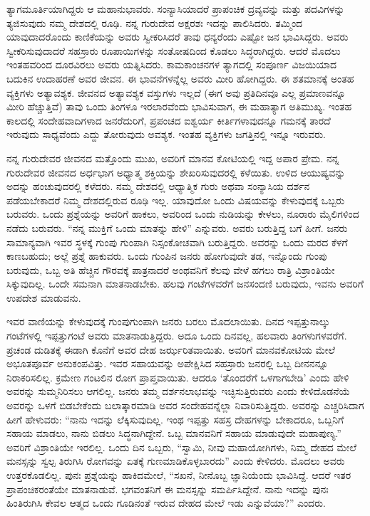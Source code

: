 ತ್ಯಾಗಮೂರ್ತಿಯಾಗಿದ್ದರು ಆ ಮಹಾನುಭಾವರು. ಸಂನ್ಯಾಸಿಯಾದರೆ ಪ್ರಾಪಂಚಿಕ ದ್ರವ್ಯವನ್ನು ಮತ್ತು ಪದವಿಗಳನ್ನು ತ್ಯಜಿಸುವುದು ನಮ್ಮ ದೇಶದಲ್ಲಿ ರೂಢಿ. ನನ್ನ ಗುರುದೇವ ಅಕ್ಷರಶಃ ಇದನ್ನು ಪಾಲಿಸಿದರು. ತಮ್ಮಿಂದ ಯಾವುದಾದರೊಂದು ಕಾಣಿಕೆಯನ್ನು ಅವರು ಸ್ವೀಕರಿಸಿದರೆ ತಾವು ಧನ್ಯರೆಂದು ಎಷ್ಟೋ ಜನ ಭಾವಿಸಿದ್ದರು. ಅವರು ಸ್ವೀಕರಿಸುವುದಾದರೆ ಸಹಸ್ರಾರು ರೂಪಾಯಿಗಳನ್ನು ಸಂತೋಷದಿಂದ ಕೊಡಲು ಸಿದ್ಧರಾಗಿದ್ದರು. ಆದರೆ ಮೊದಲು ಇಂತಹವರಿಂದ ದೂರವಿರಲು ಅವರು ಯತ್ನಿಸಿದರು. ಕಾಮಕಾಂಚನಗಳ ತ್ಯಾಗದಲ್ಲಿ ಸಂಪೂರ್ಣ ವಿಜಯಿಯಾದ ಬದುಕಿನ ಉದಾಹರಣೆ ಅವರ ಜೀವನ. ಈ ಭಾವನೆಗಳನ್ನೆಲ್ಲ ಅವರು ಮೀರಿ ಹೋಗಿದ್ದರು. ಈ ಶತಮಾನಕ್ಕೆ ಅಂತಹ ವ್ಯಕ್ತಿಗಳು ಅತ್ಯಾವಶ್ಯಕ. ಜೀವನದ ಅತ್ಯಾವಶ್ಯಕ ವಸ್ತುಗಳು ಇಲ್ಲದೆ (ಈಗ ಅವು ಪ್ರತಿದಿನವೂ ಎಲ್ಲ ಪ್ರಮಾಣವನ್ನೂ ಮೀರಿ ಹೆಚ್ಚುತ್ತಿವೆ) ತಾವು ಒಂದು ತಿಂಗಳೂ ಇರಲಾರವೆಂದು ಭಾವಿಸುವಾಗ, ಈ ಮಹಾತ್ಯಾಗ ಅತಿಮುಖ್ಯ. ಇಂತಹ ಕಾಲದಲ್ಲಿ ಸಂದೇಹವಾದಿಗಳಾದ ಜನರೆದುರಿಗೆ, ಪ್ರಪಂಚದ ಐಶ್ವರ್ಯ ಕೀರ್ತಿಗಳಾವುದನ್ನೂ ಗಮನಕ್ಕೆ ತಾರದೆ ಇರುವುದು ಸಾಧ್ಯವೆಂದು ಎದ್ದು ತೋರುವುದು ಅವಶ್ಯಕ. ಇಂತಹ ವ್ಯಕ್ತಿಗಳು ಜಗತ್ತಿನಲ್ಲಿ ಇನ್ನೂ ಇರುವರು.

ನನ್ನ ಗುರುದೇವರ ಜೀವನದ ಮತ್ತೊಂದು ಮುಖ, ಅವರಿಗೆ ಮಾನವ ಕೋಟಿಯಲ್ಲಿ ಇದ್ದ ಅಪಾರ ಪ್ರೇಮ. ನನ್ನ ಗುರುದೇವರ ಜೀವನದ ಅರ್ಧಭಾಗ ಅಧ್ಯಾತ್ಮ ಶಕ್ತಿಯನ್ನು ಶೇಖರಿಸುವುದರಲ್ಲಿ ಕಳೆಯಿತು. ಉಳಿದ ಆಯುಷ್ಯವನ್ನು ಅದನ್ನು ಹಂಚುವುದರಲ್ಲಿ ಕಳೆದರು. ನಮ್ಮ ದೇಶದಲ್ಲಿ ಆಧ್ಯಾತ್ಮಿಕ ಗುರು ಅಥವಾ ಸಂನ್ಯಾಸಿಯ ದರ್ಶನ ಪಡೆಯಬೇಕಾದರೆ ನಿಮ್ಮ ದೇಶದಲ್ಲಿರುವ ರೂಢಿ ಇಲ್ಲ. ಯಾವುದೋ ಒಂದು ವಿಷಯವನ್ನು ಕೇಳುವುದಕ್ಕೆ ಒಬ್ಬರು ಬರುವರು. ಒಂದು ಪ್ರಶ್ನೆಯನ್ನು ಅವರಿಗೆ ಹಾಕಲು, ಅವರಿಂದ ಒಂದು ನುಡಿಯನ್ನು ಕೇಳಲು, ನೂರಾರು ಮೈಲಿಗಳಿಂದ ನಡೆದು ಬರುವರು. “ನನ್ನ ಮುಕ್ತಿಗೆ ಒಂದು ಮಾತನ್ನು ಹೇಳಿ” ಎನ್ನುವರು. ಅವರು ಬರುತ್ತಿದ್ದ ಬಗೆ ಹೀಗೆ. ಜನರು ಸಾಮಾನ್ಯವಾಗಿ ಇವರ ಸ್ಥಳಕ್ಕೆ ಗುಂಪು ಗುಂಪಾಗಿ ನಿಸ್ಸಂಕೋಚವಾಗಿ ಬರುತ್ತಿದ್ದರು. ಅವರನ್ನು ಒಂದು ಮರದ ಕೆಳಗೆ ಕಾಣಬಹುದು; ಅಲ್ಲೆ ಪ್ರಶ್ನೆ ಹಾಕುವರು. ಒಂದು ಗುಂಪಿನ ಜನರು ಹೋಗುವುದೇ ತಡ, ಇನ್ನೊಂದು ಗುಂಪು ಬರುವುದು, ಒಬ್ಬ ಅತಿ ಹೆಚ್ಚಿನ ಗೌರವಕ್ಕೆ ಪಾತ್ರನಾದರೆ ಅಂಥವನಿಗೆ ಕೆಲವು ವೇಳೆ ಹಗಲು ರಾತ್ರಿ ವಿಶ್ರಾಂತಿಯೇ ಸಿಕ್ಕುವುದಿಲ್ಲ. ಒಂದೇ ಸಮನಾಗಿ ಮಾತನಾಡಬೇಕು. ಹಲವು ಗಂಟೆಗಳವರೆಗೆ ಜನಸಂದಣಿ ಬರುವುದು, ಇವನು ಅವರಿಗೆ ಉಪದೇಶ ಮಾಡುವನು.

ಇವರ ವಾಣಿಯನ್ನು ಕೇಳುವುದಕ್ಕೆ ಗುಂಪುಗುಂಪಾಗಿ ಜನರು ಬರಲು ಮೊದಲಾಯಿತು. ದಿನದ ಇಪ್ಪತ್ತುನಾಲ್ಕು ಗಂಟೆಗಳಲ್ಲಿ ಇಪ್ಪತ್ತುಗಂಟೆ ಅವರು ಮಾತನಾಡುತ್ತಿದ್ದರು. ಅದೂ ಒಂದು ದಿನವಲ್ಲ, ಹಲವಾರು ತಿಂಗಳುಗಳವರೆಗೆ. ಪ್ರಚಂಡ ದುಡಿತಕ್ಕೆ ಈಡಾಗಿ ಕೊನೆಗೆ ಅವರ ದೇಹ ಜರ್ಝರಿತವಾಯಿತು. ಅವರಿಗೆ ಮಾನವಕೋಟಿಯ ಮೇಲೆ ಅಭೂತಪೂರ್ವ ಅನುಕಂಪವಿತ್ತು. ಇವರ ಸಹಾಯವನ್ನು ಅಪೇಕ್ಷಿಸಿದ ಸಹಸ್ರಾರು ಜನರಲ್ಲಿ ಒಬ್ಬ ದೀನನನ್ನೂ ನಿರಾಕರಿಸಲಿಲ್ಲ. ಕ್ರಮೇಣ ಗಂಟಲಿನ ರೋಗ ಪ್ರಾಪ್ತವಾಯಿತು. ಆದರೂ ‘ತೊಂದರೆಗೆ ಒಳಗಾಗಬೇಡಿ’ ಎಂದು ಹೇಳಿ ಅವರನ್ನು ಸುಮ್ಮನಿರಿಸಲು ಆಗಲಿಲ್ಲ. ಜನರು ತಮ್ಮ ದರ್ಶನಲಾಭವನ್ನು ಇಚ್ಛಿಸುತ್ತಿರುವರು ಎಂದು ಕೇಳಿದೊಡನೆಯೆ ಅವರನ್ನು ಒಳಗೆ ಬಿಡಬೇಕೆಂದು ಬಲಾತ್ಕಾರಮಾಡಿ ಅವರ ಸಂದೇಹವನ್ನೆಲ್ಲಾ ನಿವಾರಿಸುತ್ತಿದ್ದರು. ಅವರನ್ನು ಎಚ್ಚರಿಸಿದಾಗ ಹೀಗೆ ಹೇಳುವರು: “ನಾನು ಇದನ್ನು ಲೆಕ್ಕಿಸುವುದಿಲ್ಲ. ಇಂಥ ಇಪ್ಪತ್ತು ಸಹಸ್ರ ದೇಹಗಳನ್ನು ಬೇಕಾದರೂ, ಒಬ್ಬನಿಗೆ ಸಹಾಯ ಮಾಡಲು, ನಾನು ಬಿಡಲು ಸಿದ್ಧನಾಗಿದ್ದೇನೆ. ಒಬ್ಬ ಮಾನವನಿಗೆ ಸಹಾಯ ಮಾಡುವುದೇ ಮಹಾಪುಣ್ಯ.” ಅವರಿಗೆ ವಿಶ್ರಾಂತಿಯೇ ಇರಲಿಲ್ಲ. ಒಂದು ದಿನ ಒಬ್ಬರು, “ಸ್ವಾಮಿ, ನೀವು ಮಹಾಯೋಗಿಗಳು, ನಿಮ್ಮ ದೇಹದ ಮೇಲೆ ಮನಸ್ಸನ್ನು ಸ್ವಲ್ಪ ತಿರುಗಿಸಿ ರೋಗವನ್ನು ಏತಕ್ಕೆ ಗುಣಮಾಡಿಕೊಳ್ಳಬಾರದು” ಎಂದು ಕೇಳಿದರು. ಮೊದಲು ಅವರು ಉತ್ತರಕೊಡಲಿಲ್ಲ. ಪುನಃ ಪ್ರಶ್ನೆಯನ್ನು ಹಾಕಿದಮೇಲೆ, “ಸಖನೆ, ನೀನೊಬ್ಬ ಜ್ಞಾನಿಯೆಂದು ಭಾವಿಸಿದ್ದೆ. ಆದರೆ ಇತರ ಪ್ರಾಪಂಚಿಕರಂತೆಯೇ ಮಾತನಾಡುವೆ. ಭಗವಂತನಿಗೆ ಈ ಮನಸ್ಸನ್ನು ಸಮರ್ಪಿಸಿದ್ದೇನೆ. ನಾನು ಇದನ್ನು ಪುನಃ ಹಿಂತಿರುಗಿಸಿ ಕೇವಲ ಆತ್ಮದ ಒಂದು ಗೂಡಿನಂತೆ ಇರುವ ದೇಹದ ಮೇಲೆ ಇಡು ಎನ್ನುವೆಯಾ?” ಎಂದರು.

